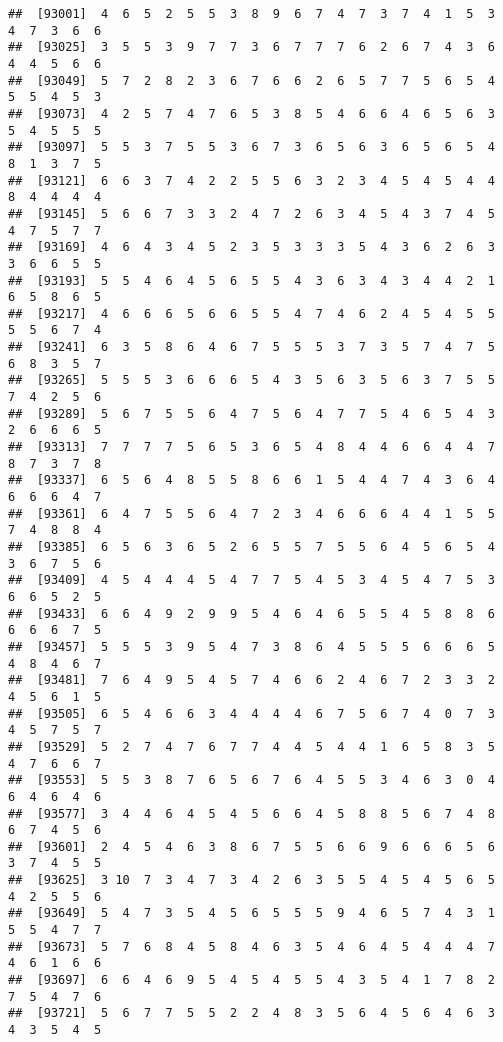 \documentclass[
]{book}
\begin{document}
\begin{verbatim}
##  [93001]  4  6  5  2  5  5  3  8  9  6  7  4  7  3  7  4  1  5  3  4  7  3  6  6
##  [93025]  3  5  5  3  9  7  7  3  6  7  7  7  6  2  6  7  4  3  6  4  4  5  6  6
##  [93049]  5  7  2  8  2  3  6  7  6  6  2  6  5  7  7  5  6  5  4  5  5  4  5  3
##  [93073]  4  2  5  7  4  7  6  5  3  8  5  4  6  6  4  6  5  6  3  5  4  5  5  5
##  [93097]  5  5  3  7  5  5  3  6  7  3  6  5  6  3  6  5  6  5  4  8  1  3  7  5
##  [93121]  6  6  3  7  4  2  2  5  5  6  3  2  3  4  5  4  5  4  4  8  4  4  4  4
##  [93145]  5  6  6  7  3  3  2  4  7  2  6  3  4  5  4  3  7  4  5  4  7  5  7  7
##  [93169]  4  6  4  3  4  5  2  3  5  3  3  3  5  4  3  6  2  6  3  3  6  6  5  5
##  [93193]  5  5  4  6  4  5  6  5  5  4  3  6  3  4  3  4  4  2  1  6  5  8  6  5
##  [93217]  4  6  6  6  5  6  6  5  5  4  7  4  6  2  4  5  4  5  5  5  5  6  7  4
##  [93241]  6  3  5  8  6  4  6  7  5  5  5  3  7  3  5  7  4  7  5  6  8  3  5  7
##  [93265]  5  5  5  3  6  6  6  5  4  3  5  6  3  5  6  3  7  5  5  7  4  2  5  6
##  [93289]  5  6  7  5  5  6  4  7  5  6  4  7  7  5  4  6  5  4  3  2  6  6  6  5
##  [93313]  7  7  7  7  5  6  5  3  6  5  4  8  4  4  6  6  4  4  7  8  7  3  7  8
##  [93337]  6  5  6  4  8  5  5  8  6  6  1  5  4  4  7  4  3  6  4  6  6  6  4  7
##  [93361]  6  4  7  5  5  6  4  7  2  3  4  6  6  6  4  4  1  5  5  7  4  8  8  4
##  [93385]  6  5  6  3  6  5  2  6  5  5  7  5  5  6  4  5  6  5  4  3  6  7  5  6
##  [93409]  4  5  4  4  4  5  4  7  7  5  4  5  3  4  5  4  7  5  3  6  6  5  2  5
##  [93433]  6  6  4  9  2  9  9  5  4  6  4  6  5  5  4  5  8  8  6  6  6  6  7  5
##  [93457]  5  5  5  3  9  5  4  7  3  8  6  4  5  5  5  6  6  6  5  4  8  4  6  7
##  [93481]  7  6  4  9  5  4  5  7  4  6  6  2  4  6  7  2  3  3  2  4  5  6  1  5
##  [93505]  6  5  4  6  6  3  4  4  4  4  6  7  5  6  7  4  0  7  3  4  5  7  5  7
##  [93529]  5  2  7  4  7  6  7  7  4  4  5  4  4  1  6  5  8  3  5  4  7  6  6  7
##  [93553]  5  5  3  8  7  6  5  6  7  6  4  5  5  3  4  6  3  0  4  6  4  6  4  6
##  [93577]  3  4  4  6  4  5  4  5  6  6  4  5  8  8  5  6  7  4  8  6  7  4  5  6
##  [93601]  2  4  5  4  6  3  8  6  7  5  5  6  6  9  6  6  6  5  6  3  7  4  5  5
##  [93625]  3 10  7  3  4  7  3  4  2  6  3  5  5  4  5  4  5  6  5  4  2  5  5  6
##  [93649]  5  4  7  3  5  4  5  6  5  5  5  9  4  6  5  7  4  3  1  5  5  4  7  7
##  [93673]  5  7  6  8  4  5  8  4  6  3  5  4  6  4  5  4  4  4  7  4  6  1  6  6
##  [93697]  6  6  4  6  9  5  4  5  4  5  5  4  3  5  4  1  7  8  2  7  5  4  7  6
##  [93721]  5  6  7  7  5  5  2  2  4  8  3  5  6  4  5  6  4  6  3  4  3  5  4  5

\end{verbatim}
\end{document}
